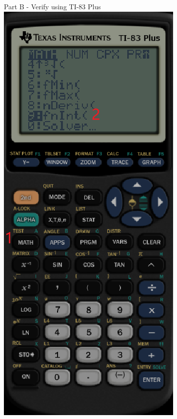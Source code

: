 \documentclass{beamer}
\begin{document}
\begin{frame}{Part B - Verify using TI-83 Plus}
    \includegraphics[scale=0.33]{5}

\end{frame}
\end{document}
